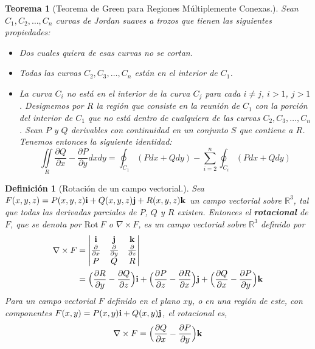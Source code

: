 \documentclass[11pt]{book}
\newcounter{Teorema}
\numberwithin{equation}{section}
\theoremstyle{plain}  %
\newtheorem{thm}{Teorema}[section]
\newtheorem{Def}{Definición}[chapter]
\begin{document}
	\begin{thm}[Teorema de Green para Regiones Múltiplemente Conexas.]
	Sean $C_1,C_2,\dotsc,C_n$ curvas de Jordan suaves a trozos que tienen las siguientes propiedades:
	\begin{itemize}
		\item Dos cuales quiera de esas curvas no se cortan.
		\item Todas las curvas $C_2,C_3,\dotsc,C_n$ están en el interior de $C_1$.
		\item La curva $C_i$ no está en el interior de la curva $C_j$ para cada $i\neq j$, $i>1$, $j>1$. Designemos por $R$ la región que consiste en la reunión de $C_1$ con la porción del interior de $C_1$ que no está dentro de cualquiera de las curvas $C_2,C_3,\dotsc,C_n$. Sean $P$ y $Q$ derivables con continuidad en un conjunto $S$ que contiene a $R$. Tenemos entonces la siguiente identidad:
		$$\iint\limits_{R}\frac{\partial Q}{\partial x}-\frac{\partial P}{\partial y}dxdy=\oint_{C_1}(Pdx+Qdy)-\sum_{i=2}^{n}\oint_{C_i}(Pdx+Qdy)$$
	\end{itemize}
\end{thm}
\begin{Def}[Rotación de un campo vectorial.] Sea $F(x,y,z)=P(x,y,z){\bf{i}}+Q(x,y,z){\bf j}+R(x,y,z){\bf k}$ un campo vectorial sobre $\mathbb{R}^{3}$, tal que todas las derivadas parciales de $P$, $Q$ y $R$ existen. Entonces el \textbf{rotacional} de $F$, que se denota por $\mathrm{Rot}\ F$ o $\nabla\times F$, es un campo vectorial sobre $\mathbb{R}^{3}$ definido por 
	\begin{align*}
		\nabla\times F&=\left|\begin{matrix}
			{\bf i}&{\bf j}&{\bf k}\\
			\frac{\partial}{\partial x}&\frac{\partial}{\partial y}&\frac{\partial}{\partial z}\\
			P&Q&R
		\end{matrix}\right|\\
	&=\Bigl(\frac{\partial R}{\partial y}-\frac{\partial Q}{\partial z}\Bigl){\bf i}+\Bigl(\frac{\partial P}{\partial z}-\frac{\partial R}{\partial x}\Bigl){\bf j}+\Bigl(\frac{\partial Q}{\partial x}-\frac{\partial P}{\partial y}\Bigl){\bf k}
	\end{align*}
Para un campo vectorial $F$ definido en el plano $xy$, o en una región de este, con componentes $F(x,y)=P(x,y){\bf i}+Q(x,y){\bf j}$, el rotacional es,
$$\nabla\times F=\Bigl(\frac{\partial Q}{\partial x}-\frac{\partial P}{\partial y}\Bigl){\bf k}$$
\end{Def}
\end{document}
